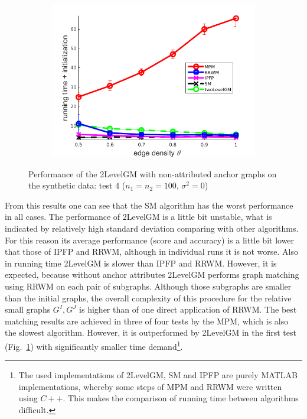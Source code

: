 \begin{figure}
\begin{subfigure}[b]{0.33\textwidth}
			\includegraphics[scale=0.25]{"chapter3/fig/SyntheticTest/no_descr/Results_v4.3.3/Test4/time_summary_avg10t"} 
		\end{subfigure} 	
	\caption[Performance of the 2LevelGM with non-attributed anchor graphs on the synthetic data (test $4$)]{Performance of the 2LevelGM with non-attributed anchor graphs on the synthetic data: test $4$ ($n_1=n_2=100$, $\sigma^2=0$)}
	\label{fig:synTest4_ver433}
\end{figure}
\FloatBarrier
From this results one can see that the SM algorithm has the worst performance in all cases. The performance of 2LevelGM is a little bit unstable, what is indicated by relatively high standard deviation comparing with other algorithms. For this reason its average performance (score and accuracy) is a little bit lower that those of IPFP and RRWM, although in individual runs it is not worse. Also in running time 2LevelGM is slower than IPFP and RRWM. However, it is expected, because without anchor attributes 2LevelGM performs graph matching using RRWM on each pair of subgraphs. Although those subgraphs are smaller than the initial graphs, the overall complexity of this procedure for the relative small graphs $G^I,G^J$ is higher than of one direct application of RRWM. The best matching results are achieved in three of four tests by the MPM, which is also the slowest algorithm. However, it is outperformed by 2LevelGM in the first test (Fig.~\ref{fig:synTest4_ver433}) with significantly smaller time demand\footnote{The used implementations of 2LevelGM, SM and IPFP are purely MATLAB implementations, whereby some steps of MPM and RRWM were written using $C++$. This makes the comparison of running time between algorithms difficult.}.

